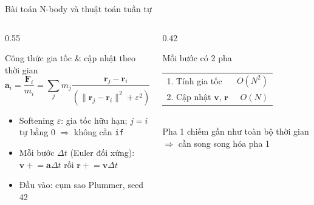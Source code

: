 \documentclass[aspectratio=169,11pt]{beamer}
\newcommand{\code}[1]{\texttt{\color{navy}#1}}
\begin{document}
\begin{frame}{Bài toán N-body và thuật toán tuần tự}
\begin{columns}[T]
\begin{column}{0.55\textwidth}
\begin{block}{Công thức gia tốc \& cập nhật theo thời gian}
\small
\[ \mathbf{a}_i = \frac{\mathbf{F}_i}{m_i} = \sum_j m_j \frac{\mathbf{r}_j-\mathbf{r}_i}{\left(\lVert\mathbf{r}_j-\mathbf{r}_i\rVert^2+\varepsilon^2\right)^{3/2}} \quad (G=1)\]
\begin{itemize}
\setlength{\itemsep}{4pt}
\item \alert{Softening} $\varepsilon$: gia tốc hữu hạn; $j=i$ tự bằng 0 $\Rightarrow$ không cần \code{if}
\item Mỗi bước $\Delta t$ (Euler đối xứng): $\mathbf{v}\mathrel{+}=\mathbf{a}\Delta t$ rồi $\mathbf{r}\mathrel{+}=\mathbf{v}\Delta t$
\item Đầu vào: cụm sao Plummer, seed 42
\end{itemize}
\end{block}
\end{column}
\begin{column}{0.42\textwidth}
\begin{block}{Mỗi bước có 2 pha}
\small
\begin{tabular}{lr}
\toprule
1. Tính gia tốc & \alert{$O(N^2)$} \\
2. Cập nhật $\mathbf{v}$, $\mathbf{r}$ & $O(N)$ \\
\bottomrule
\end{tabular}\\[8pt]
Pha 1 chiếm gần như toàn bộ thời gian $\Rightarrow$ cần song song hóa pha 1
\end{block}
\end{column}
\end{columns}
\end{frame}
\end{document}

